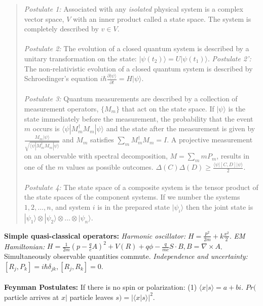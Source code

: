 \begin{quote}
\emph{Postulate 1:} Associated with any \emph {isolated}  physical system is a complex
vector space, $V$ with an inner product called a state space.  The system is completely
described by $v \in V$.
\\
\\
\emph{Postulate 2:} The evolution of a closed quantum system is described by a unitary
transformation on the state: $|\psi(t_2) \rangle  = U |\psi(t_1) \rangle $.
\emph{Postulate 2':} 
The non-relativistic evolution of a closed quantum system is described by Schroedinger's
equation $i \hbar {\frac {\partial |\psi \rangle } {\partial t}}= H |\psi \rangle $.
\\
\\
\emph{Postulate 3:} Quantum measurements are described by a collection of 
measurement operators,
$\{ M_m \}$ that act on the state space.  If $|\psi \rangle $
is the state immediately before the measurement, the probability that the event $m$ occurs
is 
$ \langle \psi | M_m^{\dagger} M_m | \psi \rangle $ 
and the state after the measurement is given by
${\frac {M_m |\psi \rangle } {\sqrt { \langle \psi | M_m^{\dagger} M_m | \psi \rangle }}}$ and $M_m$ satisfies
$\sum_m M_m^{\dagger}M_m = I$.  A projective measurement on an observable
with spectral decomposition, $M= \sum_m mP_m$, results in one of the $m$ values as possible
outcomes.  $\Delta(C) \Delta(D) \ge {\frac { \langle \psi|[C,D]|\psi \rangle } {2}}$.
\\
\\
\emph{Postulate 4:} The state space of a composite system is the tensor
product of the state spaces of the component systems.  If we number the systems
$1, 2, \ldots, n$, and system $i$ is in the prepared state $|\psi_i \rangle $ then the joint state
is $|\psi_1 \rangle  \otimes |\psi_2 \rangle  \otimes \ldots \otimes |\psi_n \rangle $.
\end{quote}
{\bf Simple quasi-classical operators:}
\emph{Harmonic oscillator:}
$H= {\frac {p^2} {2m}} + k {\frac {x^2} 2}$.  \emph{EM Hamiltonian:}
$H= {\frac 1 {2m}} (p- {\frac q c} A)^2 + V(R)+ q \phi - {\frac q {mc}} S \cdot B,
B= \nabla \times A$.
Simultaneously observable quantities commute.  \emph{Independence and uncertainty:}
$[R_j, P_k]= i \hbar \delta_{jk}, [R_j, R_k]=0$.
\\
\\
{\bf Feynman Postulates:}  If there is no spin or polarization:
(1) $ \langle x|s \rangle = a+bi$.  $Pr($ particle arrives at $x | $ particle leaves $s)= | \langle x|s \rangle |^2$.
